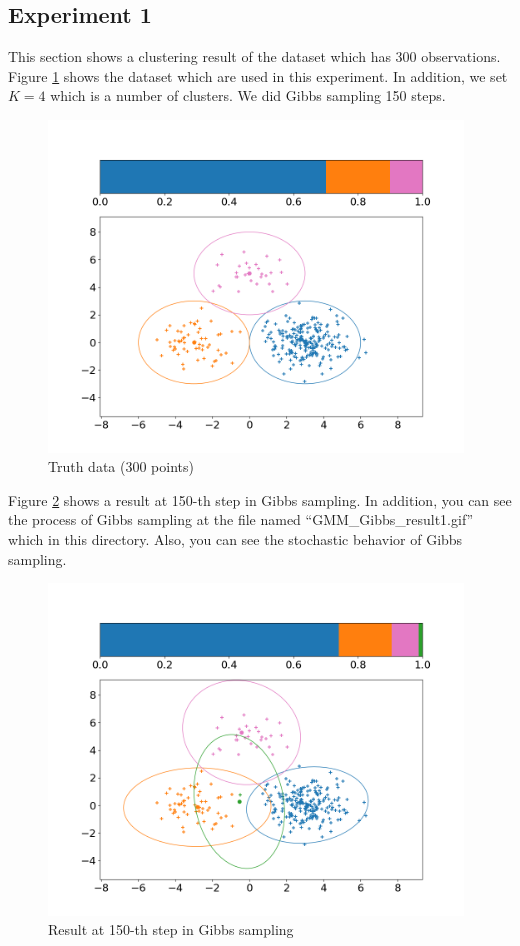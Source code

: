 \documentclass[a4paper]{article}
\begin{document}
	\subsection{Experiment 1}
	This section shows a clustering result of the dataset which has 300 observations.
	Figure \ref{fig:ex1_truth} shows the dataset which are used in this experiment.
	In addition, we set $K = 4$ which is a number of clusters.
	We did Gibbs sampling 150 steps.
	\begin{figure}[h]
		\begin{center}
			\includegraphics[width=11cm]{fig/ex1/truth.png}
			\caption{Truth data (300 points)}
			\label{fig:ex1_truth}
		\end{center}
	\end{figure}

	Figure \ref{fig:ex1_result} shows a result at 150-th step in Gibbs sampling.
	In addition, you can see the process of Gibbs sampling at the file named ``GMM\_Gibbs\_result1.gif'' which in this directory.
	Also, you can see the stochastic behavior of Gibbs sampling.
	\begin{figure}[h]
		\begin{center}
			\includegraphics[width=11cm]{fig/ex1/final.png}
			\caption{Result at 150-th step in Gibbs sampling}
			\label{fig:ex1_result}
		\end{center}
	\end{figure}
\end{document}
